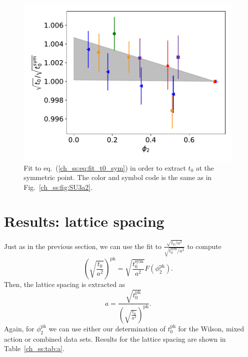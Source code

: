 \begin{figure}
    \centering
    \includegraphics[width=.7\textwidth]{./cap5/figs/t0_sym.pdf}
    \caption{Fit to eq.~(\ref{ch_ss:eq:fit_t0_sym}) in order to extract $t_0$ at the symmetric point. The color and symbol code is the same as in Fig.~\ref{ch_ss:fig:SU3a2}.}
    \label{ch_ss:fig:t0_sym}
\end{figure}

\section{Results: lattice spacing}
\label{ch_ss:sec:t0_sym}

Just as in the previous section, we can use the fit to $\frac{\sqrt{t_0/a^2}}{\sqrt{t_0^{\textrm{sym}}/a^2}}$ to compute 
\begin{equation}
\left(\sqrt{\frac{t_0}{a^2}}\right)^{\textrm{ph}}=\sqrt{\frac{t_0^{\textrm{sym}}}{a^2}}F(\phi_2^{\textrm{ph}}).
\end{equation}
Then, the lattice spacing is extracted as
\begin{equation}
\label{ch_ss:eq:a}
a=\frac{\sqrt{t_0^{\textrm{ph}}}}{\left(\sqrt{\frac{t_0}{a^2}}\right)^{\textrm{ph}}}.
\end{equation}
Again, for $\phi_2^{\textrm{ph}}$ we can use either our determination of $t_0^{\textrm{ph}}$ for the Wilson, mixed action or combined data sets. Results for the lattice spacing are shown in Table~\ref{ch_ss:tab:a}.

